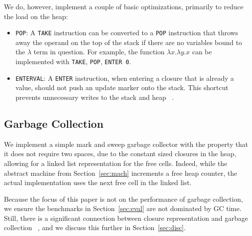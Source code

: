 We do, however, implement a couple of basic optimizations, primarily to reduce
the load on the heap:

\begin{itemize}
\item \texttt{POP}: A \texttt{TAKE} instruction can be converted to a \texttt{POP}
instruction that throws away the operand on the top of the stack if there are no
variables bound to the $\lambda$ term in question. For example, the function
$\lambda x.\lambda y.x$ can be implemented with \texttt{TAKE}, \texttt{POP},
\texttt{ENTER 0}.  
\item \texttt{ENTERVAL}: A \texttt{ENTER} instruction, when entering a
closure that is already a value, should not push an update marker onto the
stack. This shortcut prevents unnecessary writes to the stack and heap
~\cite{jonesstg, lkm, sestoft}.  
\end{itemize}

\subsection{Garbage Collection}

We implement a simple mark and sweep garbage collector with the property
that it does not require two spaces, due to the constant sized closures in the
heap, allowing for a linked list representation for the free cells.  Indeed,
while the abstract machine from Section~\ref{sec:mach} increments a free heap
counter, the actual implementation uses the next free cell in the linked list.

Because the focus of this paper is not on the performance of garbage collection,
we ensure the benchmarks in Section~\ref{sec:eval} are not dominated by GC time.
Still, there is a significant connection between closure representation and
garbage collection ~\cite{appel1988optimizing}, and we discuss this further in
Section~\ref{sec:disc}. 

